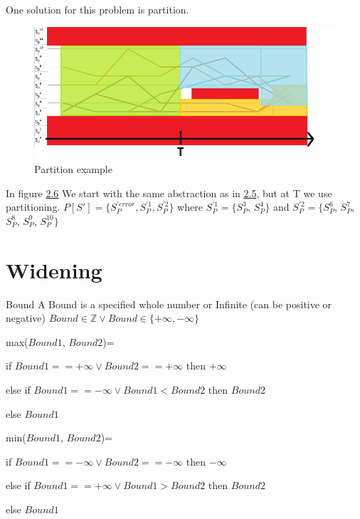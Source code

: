 One solution for this problem is partition.

 \begin{figure} [!ht]
	\centering
	\includegraphics[width=150mm, keepaspectratio]{figures/trajectory8.png}
	\caption{\label{fig:trajectory8}Partition example}
\end{figure}

 In figure \hyperref[fig:trajectory7]{2.6} We start with the same abstraction as in \hyperref[fig:trajectory7]{2.5}, but at T we use partitioning. $P[S']=\{S_{P}^{'error}, S_{P}^{'1} , S_{P}^{'2}\}$ where $S_{P}^{'1}=\{S_{P}^{3}$, $S_{P}^{4}\}$ and $S_{P}^{'2}=\{S_{P}^{6}$, $S_{P}^{7}$, $S_{P}^{8}$, $S_{P}^{9}$, $S_{P}^{10}\}$

\section{Widening}
\label{sec:widening}

\begin{definition}{Bound}
	A Bound is a specified whole number or Infinite (can be positive or negative) $Bound \in \mathbb{Z} \lor Bound \in \{ +\infty, -\infty \}$
\end{definition}

\begin{definition}{max($Bound1$, $Bound2$)=}
	
	if $Bound1 == +\infty \lor Bound2 == +\infty$ then $+\infty$
	
	else if $Bound1 == -\infty \lor Bound1<Bound2$ then $Bound2$
	
	else $Bound1$	
\end{definition}

\begin{definition}{min($Bound1$, $Bound2$)=}
	
	if $Bound1 == -\infty \lor Bound2 == -\infty$ then $-\infty$
	
	else if $Bound1 == +\infty \lor Bound1>Bound2$ then $Bound2$
	
	else $Bound1$	
\end{definition}

